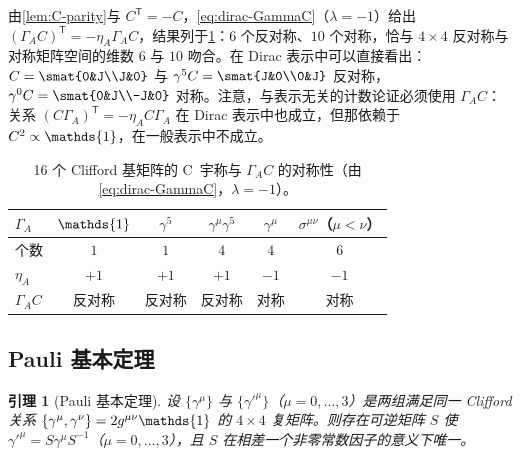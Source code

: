 \documentclass[UTF8,a4paper,11pt,fontset=fandol]{ctexart}
\let\amsmathbb\mathbb
\renewcommand{\mathbb}[1]{\ifx1#1\mathds{1}\else\amsmathbb{#1}\fi}
\theoremstyle{cplain}
\newtheorem{lemma}[theorem]{引理}
\theoremstyle{cdefinition}
\theoremstyle{cremark}
\numberwithin{equation}{section}
\newcommand{\tp}{\mathsf{T}}                         %
\begin{document}
由\cref{lem:C-parity}与 $C^{\tp}=-C$，\cref{eq:dirac-GammaC}（$\lambda=-1$）给出 $(\Gamma_AC)^{\tp}=-\eta_A\Gamma_AC$，结果列于\cref{tab:app-dirac-basis}：$6$ 个反对称、$10$ 个对称，恰与 $4\times4$ 反对称与对称矩阵空间的维数 $6$ 与 $10$ 吻合。在 Dirac 表示中可以直接看出：$C=\smat{0&J\\J&0}$ 与 $\gamma^5C=\smat{J&0\\0&J}$ 反对称，$\gamma^0C=\smat{0&J\\-J&0}$ 对称。注意，与表示无关的计数论证必须使用 $\Gamma_AC$：关系 $(C\Gamma_A)^{\tp}=-\eta_AC\Gamma_A$ 在 Dirac 表示中也成立，但那依赖于 $C^2\propto\mathbb 1$，在一般表示中不成立。

\begin{table}[htbp]
\centering
\caption{16 个 Clifford 基矩阵的 C~宇称与 $\Gamma_AC$ 的对称性（由\cref{eq:dirac-GammaC}，$\lambda=-1$）。}
\label{tab:app-dirac-basis}
\begin{tabular}{@{}lccccc@{}}
\toprule
$\Gamma_A$ & $\mathbb 1$ & $\gamma^5$ & $\gamma^\mu\gamma^5$ & $\gamma^\mu$ & $\sigma^{\mu\nu}$（$\mu<\nu$） \\
\midrule
个数 & $1$ & $1$ & $4$ & $4$ & $6$ \\
$\eta_A$ & $+1$ & $+1$ & $+1$ & $-1$ & $-1$ \\
$\Gamma_AC$ & 反对称 & 反对称 & 反对称 & 对称 & 对称 \\
\bottomrule
\end{tabular}
\end{table}

\subsection{Pauli 基本定理}\label{app:dirac-pauli}

\begin{lemma}[Pauli 基本定理]\label{lem:app-dirac-pauli}
设 $\{\gamma^\mu\}$ 与 $\{\gamma'^\mu\}$（$\mu=0,\dots,3$）是两组满足同一 Clifford 关系 $\{\gamma^\mu,\gamma^\nu\}=2g^{\mu\nu}\mathbb 1$ 的 $4\times4$ 复矩阵。则存在可逆矩阵 $S$ 使 $\gamma'^\mu=S\gamma^\mu S^{-1}$（$\mu=0,\dots,3$），且 $S$ 在相差一个非零常数因子的意义下唯一。
\end{lemma}
\end{document}
